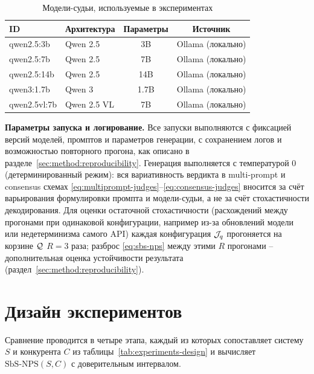 \begin{table}[htbp]
\centering
\caption{Модели-судьи, используемые в экспериментах}
\label{tab:judge-models}
\begin{tabular}{llcc}
\toprule
ID & Архитектура & Параметры & Источник \\
\midrule
qwen2.5:3b & Qwen 2.5 & 3B & Ollama (локально) \\
qwen2.5:7b & Qwen 2.5 & 7B & Ollama (локально) \\
qwen2.5:14b & Qwen 2.5 & 14B & Ollama (локально) \\
qwen3:1.7b & Qwen 3 & 1.7B & Ollama (локально) \\
qwen2.5vl:7b & Qwen 2.5 VL & 7B & Ollama (локально) \\
\bottomrule
\end{tabular}
\end{table}

\textbf{Параметры запуска и логирование.}
Все запуски выполняются с фиксацией версий моделей, промптов и
параметров генерации, с сохранением логов и возможностью повторного
прогона, как описано в разделе~\ref{sec:method:reproducibility}.
Генерация выполняется с температурой $0$ (детерминированный режим): вся
вариативность вердикта в multi-prompt и consensus схемах
\eqref{eq:multiprompt-judges}--\eqref{eq:consensus-judges} вносится за счёт
варьирования формулировки промпта и модели-судьи, а не за счёт
стохастичности декодирования.
Для оценки остаточной стохастичности (расхождений между прогонами при
одинаковой конфигурации, например из-за обновлений модели или
недетерминизма самого API) каждая конфигурация $\mathcal{J}_q$ прогоняется на
корзине $\mathcal{Q}$ $R = 3$ раза; разброс \eqref{eq:sbs-nps} между этими $R$
прогонами -- дополнительная оценка устойчивости результата
(раздел~\ref{sec:method:reproducibility}).

\section{Дизайн экспериментов}
\label{sec:experiments:design}

Сравнение проводится в четыре этапа, каждый из которых сопоставляет
систему $S$ и конкурента $C$ из таблицы~\ref{tab:experiments-design} и
вычисляет $\mathrm{SbS\text{-}NPS}(S, C)$ с доверительным интервалом.

